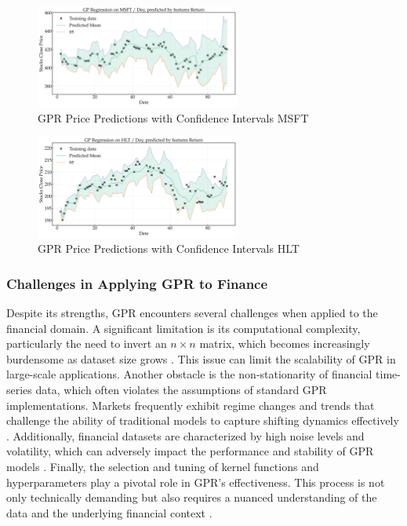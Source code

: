 \begin{figure}[h]
    \centering
    \includegraphics[width=0.6\textwidth]{figures/future_predictions_MSFT.png}
    \caption{GPR Price Predictions with Confidence Intervals MSFT}
    \label{fig:gpr_predictions_MSFT_price}
\end{figure}

\begin{figure}[h]
    \centering
    \includegraphics[width=0.6\textwidth]{figures/future_predictions_HLT.png}
    \caption{GPR Price Predictions with Confidence Intervals HLT}
    \label{fig:gpr_predictions_HLT_price}
\end{figure}

\subsubsection{Challenges in Applying GPR to Finance}
Despite its strengths, \ac{GPR} encounters several challenges when applied to the financial domain. A significant limitation is its computational complexity, particularly the need to invert an $n \times n$ matrix, which becomes increasingly burdensome as dataset size grows \cite{williams2006gaussian, quinonero2005unifying}. This issue can limit the scalability of \ac{GPR} in large-scale applications.
Another obstacle is the non-stationarity of financial time-series data, which often violates the assumptions of standard \ac{GPR} implementations. Markets frequently exhibit regime changes and trends that challenge the ability of traditional models to capture shifting dynamics effectively \cite{tsay2010analysis, hamilton1994time}.
Additionally, financial datasets are characterized by high noise levels and volatility, which can adversely impact the performance and stability of \ac{GPR} models \cite{cont2001empirical}.
Finally, the selection and tuning of kernel functions and hyperparameters play a pivotal role in \ac{GPR}'s effectiveness. This process is not only technically demanding but also requires a nuanced understanding of the data and the underlying financial context \cite{rasmussen2006gaussian, duvenaud2014automatic}.

